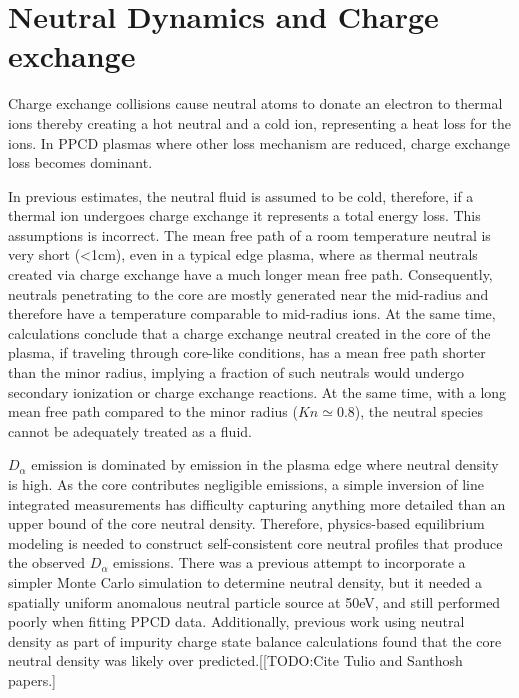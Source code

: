 \documentclass[aip, pop, preprint]{revtex4-1}
\begin{document}
\section{Neutral Dynamics and Charge exchange}\label{sec:neutral}

Charge exchange collisions cause neutral atoms to donate an electron to thermal ions thereby creating a hot neutral and a cold ion, representing a heat loss for the ions. In PPCD plasmas where other
loss mechanism are reduced, charge exchange loss becomes dominant. 

In previous estimates, the neutral fluid is assumed to be cold, therefore, if a
thermal ion undergoes charge exchange it represents a total energy loss. This
assumptions is incorrect. The mean free path of a room temperature neutral is
very short (<1cm), even in a typical edge plasma, where as thermal neutrals created
via charge exchange have a much longer mean free path. Consequently, neutrals
penetrating to the core are mostly generated near the mid-radius and therefore
have a temperature comparable to mid-radius ions. At the same time,
calculations conclude that a charge exchange neutral created in the core of
the plasma, if traveling through core-like conditions, has a mean free path
shorter than the minor radius, implying a fraction of such neutrals would
undergo secondary ionization or charge exchange reactions.  At the same time,
with a long mean free path compared to the minor radius ($Kn \simeq 0.8$), the
neutral species cannot be adequately treated as a fluid. 

$D_{\alpha}$ emission is dominated by emission in
the plasma edge where neutral density is high. As the core contributes
negligible emissions, a simple inversion of line integrated measurements has
difficulty capturing anything more detailed than an upper bound of the core neutral density.
Therefore, physics-based equilibrium modeling is needed to construct self-consistent core neutral profiles that produce the observed $D_{\alpha}$ emissions. There was a previous attempt to incorporate a simpler Monte Carlo simulation to determine neutral density, but it needed a spatially uniform anomalous neutral particle source at 50eV, and still performed poorly when fitting PPCD data. Additionally, previous work using neutral density as part of impurity charge state balance calculations found that the core neutral density was likely over predicted.[[TODO:Cite Tulio and Santhosh papers.]
\end{document}
